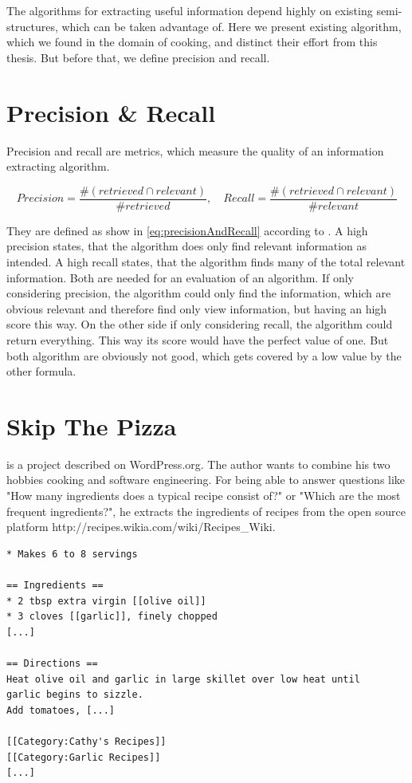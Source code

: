 \documentclass[12pt, twoside]{report}
\begin{document}
The algorithms for extracting useful information depend highly on existing semi-structures, which can be taken advantage of. Here we present existing algorithm, which we found in the domain of cooking, and distinct their effort from this thesis. But before that, we define precision and recall.

\section{Precision \& Recall}
Precision and recall are metrics, which measure the quality of an information extracting algorithm.

\begin{equation} \label{eq:precisionAndRecall}
	Precision = \frac{\#(retrieved \cap relevant)}{\#retrieved}, \hspace{1em} Recall = \frac{\#(retrieved \cap relevant)}{\#relevant}
\end{equation}

They are defined as show in \cref{eq:precisionAndRecall} according to  \parencite{surveyOfTextMining}. A high precision states, that the algorithm does only find relevant information as intended. A high recall states, that the algorithm finds many of the total relevant information. Both are needed for an evaluation of an algorithm. If only considering precision, the algorithm could only find the information, which are obvious relevant and therefore find only view information, but having an high score this way. On the other side if only considering recall, the algorithm could return everything. This way its score would have the perfect value of one. But both algorithm are obviously not good, which gets covered by a low value by the other formula.


\section{Skip The Pizza}
\parencite{REgutGenug} is a project described on WordPress.org. The author wants to combine his two hobbies cooking and software engineering. For being able to answer questions like "How many ingredients does a typical recipe consist of?" or "Which are the most frequent ingredients?", he extracts the ingredients of recipes from the open source platform http://recipes.wikia.com/wiki/Recipes\_Wiki.

\begin{lstlisting}[frame=single, basicstyle=\footnotesize\ttfamily,caption={Shortened example recipe from \\ http://recipes.wikia.com/wiki/Recipes\_Wiki}, label=lst:recipeWiki]
* Makes 6 to 8 servings

== Ingredients ==
* 2 tbsp extra virgin [[olive oil]]
* 3 cloves [[garlic]], finely chopped
[...]

== Directions ==
Heat olive oil and garlic in large skillet over low heat until
garlic begins to sizzle.
Add tomatoes, [...]

[[Category:Cathy's Recipes]]
[[Category:Garlic Recipes]]
[...]
\end{lstlisting}
\end{document}
